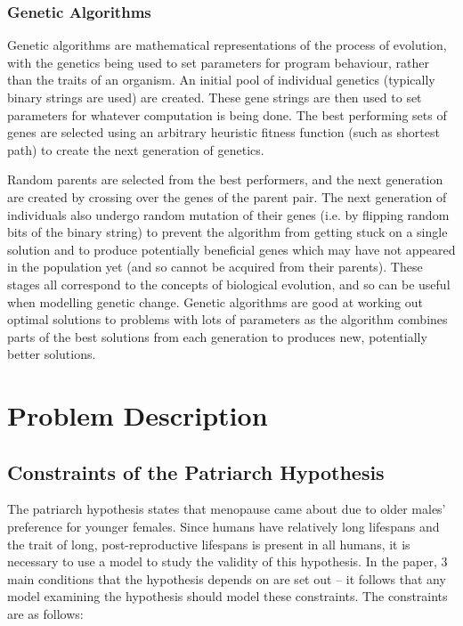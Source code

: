 \documentclass[authoryearcitations]{UoYCSproject}
\begin{document}
\subsection{Genetic Algorithms}
Genetic algorithms are mathematical representations of the process of evolution, with the genetics being used to set parameters for program behaviour, rather than the traits of an organism. An initial pool of individual genetics (typically binary strings are used) are created. These gene strings are then used to set parameters for whatever computation is being done. The best performing sets of genes are selected using an arbitrary heuristic fitness function (such as shortest path) to create the next generation of genetics. 

Random parents are selected from the best performers, and the next generation are created by crossing over the genes of the parent pair. The next generation of individuals also undergo random mutation of their genes (i.e. by flipping random bits of the binary string) to prevent the algorithm from getting stuck on a single solution and to produce potentially beneficial genes which may have not appeared in the population yet (and so cannot be acquired from their parents). These stages all correspond to the concepts of biological evolution, and so can be useful when modelling genetic change. Genetic algorithms are good at working out optimal solutions to problems with lots of parameters as the algorithm combines parts of the best solutions from each generation to produces new, potentially better solutions. 


\chapter{Problem Description}
\label{cha:Problem Description}

\section{Constraints of the Patriarch Hypothesis}
The patriarch hypothesis \cite{patriarchHypothesis2000} states that menopause came about due to older males' preference for younger females. Since humans have relatively long lifespans and the trait of long, post-reproductive lifespans is present in all humans, it is necessary to use a model to study the validity of this hypothesis. In the paper, 3 main conditions that the hypothesis depends on are set out -- it follows that any model examining the hypothesis should model these constraints. The constraints are as follows:
\end{document}
